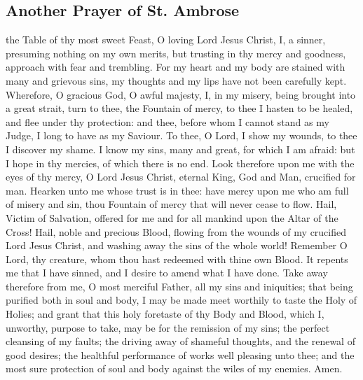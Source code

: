\subsection{Another Prayer of St. Ambrose}
 the Table of thy most sweet Feast, O loving Lord Jesus Christ, I, a sinner, presuming nothing on my own merits, but trusting in thy mercy and goodness, approach with fear and trembling. For my heart and my body are stained with many and grievous sins, my thoughts and my lips have not been carefully kept. Wherefore, O gracious God, O awful majesty, I, in my misery, being brought into a great strait, turn to thee, the Fountain of mercy, to thee I hasten to be healed, and flee under thy protection: and thee, before whom I cannot stand as my Judge, I long to have as my Saviour. To thee, O Lord, I show my wounds, to thee I discover my shame. I know my sins, many and great, for which I am afraid: but I hope in thy mercies, of which there is no end. Look therefore upon me with the eyes of thy mercy, O Lord Jesus Christ, eternal King, God and Man, crucified for man. Hearken unto me whose trust is in thee: have mercy upon me who am full of misery and sin, thou Fountain of mercy that will never cease to flow. Hail, Victim of Salvation, offered for me and for all mankind upon the Altar of the Cross! Hail, noble and precious Blood, flowing from the wounds of my crucified Lord Jesus Christ, and washing away the sins of the whole world! Remember O Lord, thy creature, whom thou hast redeemed with thine own Blood. It repents me that I have sinned, and I desire to amend what I have done. Take away therefore from me, O most merciful Father, all my sins and iniquities; that being purified both in soul and body, I may be made meet worthily to taste the Holy of Holies; and grant that this holy foretaste of thy Body and Blood, which I, unworthy, purpose to take, may be for the remission of my sins; the perfect cleansing of my faults; the driving away of shameful thoughts, and the renewal of good desires; the healthful performance of works well pleasing unto thee; and the most sure protection of soul and body against the wiles of my enemies. Amen. 
